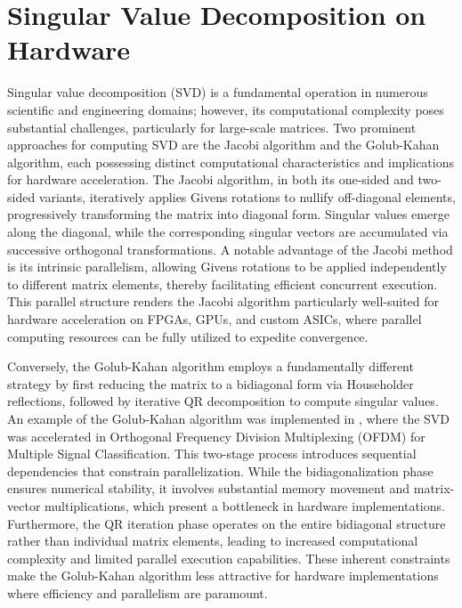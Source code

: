 
\section{Singular Value Decomposition on Hardware}
Singular value decomposition (SVD) is a fundamental operation in numerous scientific and engineering domains; however, its computational complexity poses substantial challenges, particularly for large-scale matrices. Two prominent approaches for computing SVD are the Jacobi algorithm and the Golub-Kahan algorithm, each possessing distinct computational characteristics and implications for hardware acceleration. The Jacobi algorithm, in both its one-sided and two-sided variants, iteratively applies Givens rotations to nullify off-diagonal elements, progressively transforming the matrix into diagonal form\cite{svd_architecture-6}. Singular values emerge along the diagonal, while the corresponding singular vectors are accumulated via successive orthogonal transformations. A notable advantage of the Jacobi method is its intrinsic parallelism, allowing Givens rotations to be applied independently to different matrix elements, thereby facilitating efficient concurrent execution. This parallel structure renders the Jacobi algorithm particularly well-suited for hardware acceleration on FPGAs, GPUs, and custom ASICs, where parallel computing resources can be fully utilized to expedite convergence.

Conversely, the Golub-Kahan algorithm employs a fundamentally different strategy by first reducing the matrix to a bidiagonal form via Householder reflections, followed by iterative QR decomposition to compute singular values\cite{svd-hardware-1}. An example of the Golub-Kahan algorithm was implemented in \cite{svd-hardware-2}, where the SVD was accelerated in Orthogonal Frequency Division Multiplexing (OFDM) for Multiple Signal Classification. This two-stage process introduces sequential dependencies that constrain parallelization. While the bidiagonalization phase ensures numerical stability, it involves substantial memory movement and matrix-vector multiplications, which present a bottleneck in hardware implementations. Furthermore, the QR iteration phase operates on the entire bidiagonal structure rather than individual matrix elements, leading to increased computational complexity and limited parallel execution capabilities. These inherent constraints make the Golub-Kahan algorithm less attractive for hardware implementations where efficiency and parallelism are paramount.

